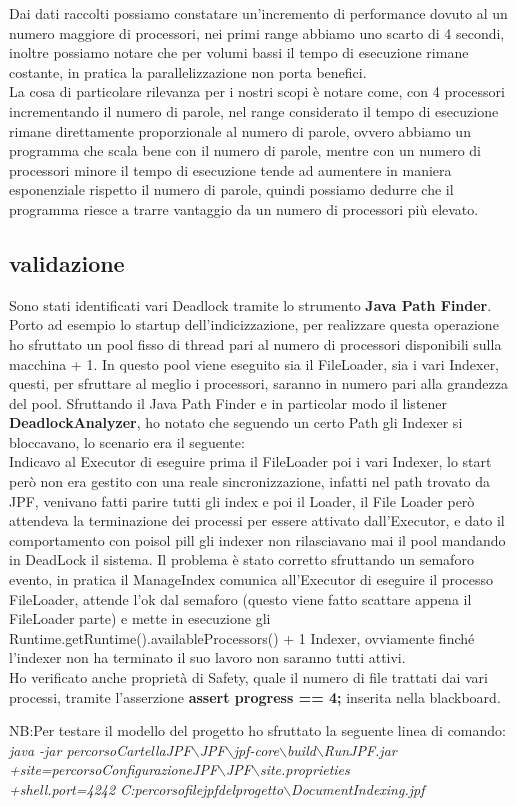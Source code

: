 \documentclass{article}
\begin{document}
Dai dati raccolti possiamo constatare un'incremento di performance dovuto al un numero maggiore di processori, nei primi range abbiamo uno scarto di 4 secondi, inoltre possiamo notare che per volumi bassi il tempo di esecuzione rimane costante, in pratica la parallelizzazione non porta benefici.\\
La cosa di particolare rilevanza per i nostri scopi è notare come, con 4 processori incrementando il numero di parole, nel range considerato il tempo di esecuzione rimane direttamente proporzionale al numero di parole, ovvero abbiamo un programma che scala bene con il numero di parole, mentre con un numero di processori minore il tempo di esecuzione tende ad aumentere in maniera esponenziale rispetto il numero di parole, quindi possiamo dedurre che il programma riesce a trarre vantaggio da un numero di processori più elevato.

\subsection{validazione}

Sono stati identificati vari Deadlock tramite lo strumento \textbf{Java Path Finder}.
Porto ad esempio lo startup dell'indicizzazione, per realizzare questa operazione ho sfruttato un pool fisso di thread pari al numero di processori disponibili sulla macchina + 1. In questo pool viene eseguito sia il FileLoader, sia i vari Indexer, questi, per sfruttare al meglio i processori, saranno in numero pari alla grandezza del pool. Sfruttando il Java Path Finder e in particolar modo il listener \textbf{DeadlockAnalyzer}, ho notato che seguendo un certo Path gli Indexer si bloccavano, lo scenario era il seguente:\\
Indicavo al Executor di eseguire prima il FileLoader poi i vari Indexer, lo start però non era gestito con una reale sincronizzazione, infatti nel path trovato da JPF, venivano fatti parire tutti gli index e poi il Loader, il File Loader però attendeva la terminazione dei processi per essere attivato dall'Executor, e dato il comportamento con poisol pill gli indexer non rilasciavano mai il pool mandando in DeadLock il sistema. Il problema è stato corretto sfruttando un semaforo evento, in pratica il ManageIndex comunica all'Executor di eseguire il processo FileLoader, attende l'ok dal semaforo (questo viene fatto scattare appena il FileLoader parte) e mette in esecuzione gli Runtime.getRuntime().availableProcessors() + 1 Indexer, ovviamente finché l'indexer non ha terminato il suo lavoro non saranno tutti attivi.
\\
Ho verificato anche proprietà di Safety, quale il numero di file trattati dai vari processi, tramite l'asserzione \textbf{assert progress == 4;} inserita nella blackboard.

NB:Per testare il modello del progetto ho sfruttato la seguente linea di comando:\\ 
\textit{java -jar percorsoCartellaJPF$\backslash$JPF$\backslash$jpf-core$\backslash$build$\backslash$RunJPF.jar\\ +site=percorsoConfigurazioneJPF$\backslash$JPF$\backslash$site.proprieties\\+shell.port=4242 C:percorsofilejpfdelprogetto$\backslash$DocumentIndexing.jpf } 
\end{document}
